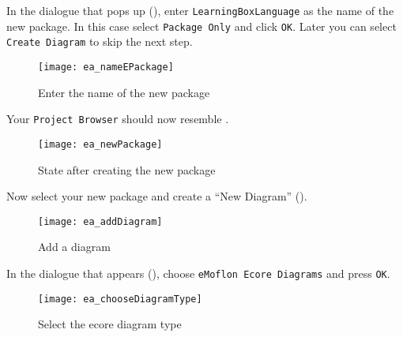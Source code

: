 \begin{stepbystep}
\clearpage

\item In the dialogue that pops up (), enter \texttt{LearningBoxLanguage} as the name of the new
package. In this case select \texttt{Package Only} and click \texttt{OK}. Later you can select \texttt{Create Diagram} to skip the next step.

\vspace{0.5cm}

\begin{figure}[htbp]
	\centering
    \texttt{[image: ea\_nameEPackage]}
	\caption{Enter the name of the new package}
	\label{ea:newPackageName}
\end{figure}
\FloatBarrier

\vspace{0.5cm}

\item Your \texttt{Project Browser} should now resemble .

\vspace{0.5cm}

\begin{figure}[htbp]
	\centering
  \texttt{[image: ea\_newPackage]}
	\caption{State after creating the new package}
	\label{ea:newPackageComplete}
\end{figure}
\FloatBarrier

\vspace{0.5cm}

\item Now select your new package and create a ``New Diagram'' ().

\vspace{0.5cm}

\begin{figure}[htbp]
	\centering
  \texttt{[image: ea\_addDiagram]}
	\caption{Add a diagram}
	\label{ea:newDiagram}
\end{figure}
\FloatBarrier

\clearpage

\item In the dialogue that appears (), choose \texttt{eMoflon Ecore Diagrams} and press \texttt{OK}. 

\begin{figure}[htbp]
	\centering
  \texttt{[image: ea\_chooseDiagramType]}
	\caption{Select the ecore diagram type}
	\label{ea:diagramType}
\end{figure}
\FloatBarrier


\end{stepbystep}
